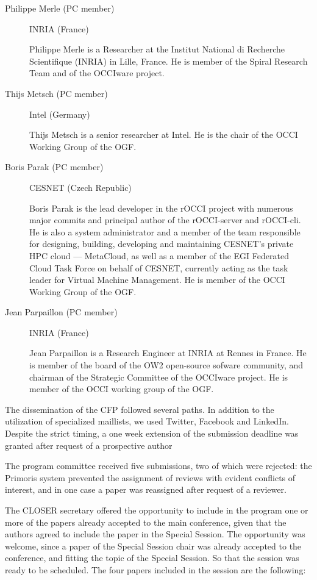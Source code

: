 \documentclass[10pt,a4paper]{article}
\begin{document}
\begin{description}
	\item[Philippe Merle (PC member)] INRIA (France)
	
	Philippe Merle is a Researcher at the Institut National di Recherche Scientifique (INRIA) in Lille, France. He is member of the Spiral Research Team and of the OCCIware project.
	\item[Thijs Metsch (PC member)] Intel (Germany)
	
	Thijs Metsch is a senior researcher at Intel. He is the chair of the OCCI Working Group of the OGF.
	
	\item[Boris Parak (PC member)] CESNET (Czech Republic)
	
	Boris Parak is the lead developer in the rOCCI project with numerous major commits and principal author of the rOCCI-server and rOCCI-cli. He is also a system administrator and a member of the team responsible for designing, building, developing and maintaining CESNET’s private HPC cloud — MetaCloud, as well as a member of the EGI Federated Cloud Task Force on behalf of CESNET, currently acting as the task leader for Virtual Machine Management. He is member of the OCCI Working Group of the OGF.
	
	\item[Jean Parpaillon (PC member)] INRIA (France)
	
	Jean Parpaillon is a Research Engineer at INRIA at Rennes in France. He is member of the board of the OW2 open-source sofware community, and chairman of the Strategic Committee of the OCCIware project. He is member of the OCCI working group of the OGF.

\end{description}

The dissemination of the CFP followed several paths. In addition to the utilization of specialized maillists, we used Twitter, Facebook and LinkedIn. Despite the strict timing, a one week extension of the submission deadline was granted after request of a prospective author

The program committee received five submissions, two of which were rejected: the Primoris system prevented the assignment of reviews with evident conflicts of interest, and in one case a paper was reassigned after request of a reviewer.

The CLOSER secretary offered the opportunity to include in the program one or more of the papers already accepted to the main conference, given that the authors agreed to include the paper in the Special Session. The opportunity was welcome, since a paper of the Special Session chair was already accepted to the conference, and fitting the topic of the Special Session. So that the session was ready to be scheduled. The four papers included in the session are the following:
\end{document}
